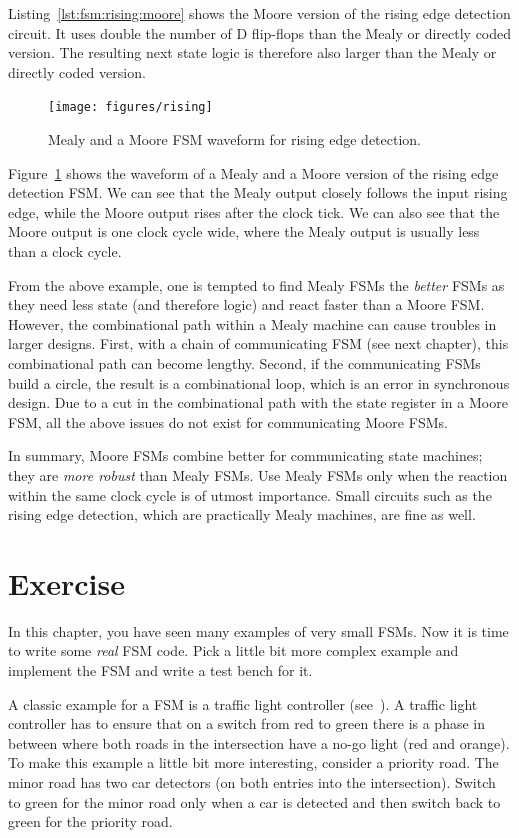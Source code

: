 \documentclass[%
    10pt,
    headinclude, footexclude,
    openright, %
    notitlepage,
    cleardoubleempty,
    headsepline,
    pointlessnumbers,
    bibtotoc, idxtotoc,
    ]{scrbook}
\begin{document}
Listing~\ref{lst:fsm:rising:moore} shows the Moore version of the rising edge detection
circuit. It uses double the number of D flip-flops than the Mealy or directly
coded version. The resulting next state logic is therefore also larger
than the Mealy or directly coded version.

\begin{figure}
  \centering
  \texttt{[image: figures/rising]}
  \caption{Mealy and a  Moore FSM waveform for rising edge detection.}
  \label{fig:rising}
\end{figure}

Figure~\ref{fig:rising} shows the waveform of a Mealy and a  Moore version
of the rising edge detection FSM. We can see that the Mealy output closely
follows the input rising edge, while the Moore output rises after the clock tick.
We can also see that the Moore output is one clock cycle wide, where the Mealy
output is usually less than a clock cycle.

From the above example, one is tempted to find Mealy FSMs the \emph{better}
FSMs as they need less state (and therefore logic) and react faster than a Moore FSM.
However, the combinational path within a Mealy machine can cause troubles in
larger designs. First, with a chain of communicating FSM (see next chapter), this
combinational path can become lengthy. Second, if the communicating FSMs build
a circle, the result is a combinational loop, which is an error in synchronous design.
Due to a cut in the combinational path with the state register in a Moore FSM,
all the above issues do not exist for communicating Moore FSMs.

In summary, Moore FSMs combine better for communicating state machines; they
are \emph{more robust} than Mealy FSMs. Use Mealy FSMs only when the reaction within the same
clock cycle is of utmost importance. Small circuits such as the rising edge detection,
which are practically Mealy machines, are fine as well.

\section{Exercise}

In this chapter, you have seen many examples of very small FSMs.
Now it is time to write some \emph{real} FSM code.
Pick a little bit more complex example and implement the FSM and
write a test bench for it.

A classic example for a FSM is a traffic light controller (see~\cite[Section~14.3]{dally:vhdl:2016}).
A traffic light controller has to ensure that on a switch from red to green
there is a phase in between where both roads in the intersection
have a no-go light (red and orange).
To make this example a little bit more interesting, consider a priority road.
The minor road has two car detectors (on both entries into the intersection).
Switch to green for the minor road only when a car is detected and then switch
back to green for the priority road.
\end{document}

